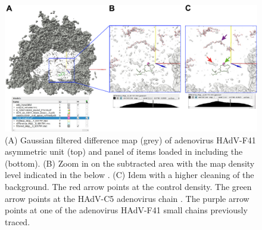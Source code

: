 \begin{itemize}
                            \begin{figure}[H]
                            \centering 
                            \captionsetup{width=.9\linewidth} 
                            \includegraphics[width=.9\textwidth]{Images_appendix/Fig315.pdf}
                            \caption{(A) Gaussian filtered difference map (grey) of adenovirus HAdV-F41 asymmetric unit (top) and  panel of items loaded in \chimera including the   (bottom). (B) Zoom in on the subtracted area with the map density level indicated in the  below . (C) Idem with a higher cleaning of the background. The red arrow points at the control density. The green arrow points at the HAdV-C5 adenovirus chain . The purple arrow points at one of the adenovirus HAdV-F41 small chains previously traced.}  
                            \label{fig:app_usecase_mapsubtract_6}
                            \end{figure}
                
\end{itemize}
